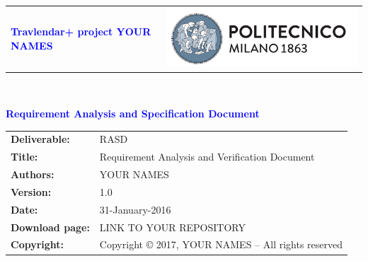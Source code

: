 





\begin{titlepage}



{\begin{table}[t!]
\centering
\begin{tabularx}{\textwidth}{@{}X X@{}}
        \textcolor{Blue}{\textbf{\small{Travlendar+ project YOUR NAMES}}} & \includegraphics[scale=0.5]{Images/PolimiLogo}
        \end{tabularx}
\end{table}}~\\ [7cm]


\begin{flushleft}

{\textcolor{Blue}{\textbf{\Huge{Requirement Analysis and Specification
        Document}}}} \\ [1cm]

\end{flushleft}

\end{titlepage}

\begin{table}[h!]
        \centering
        \begin{tabular}{@{} l p{} @{}}
            \hline
            \textbf{Deliverable:} & RASD \\ 
            \textbf{Title:} & Requirement Analysis and Verification Document \\
            \textbf{Authors:} & YOUR NAMES \\
            \textbf{Version:} & 1.0 \\ 
            \textbf{Date:} & 31-January-2016 \\
            \textbf{Download page:} & LINK TO YOUR REPOSITORY \\
            \textbf{Copyright:} & Copyright © 2017, YOUR NAMES – All rights reserved \\
            \hline
        \end{tabular}
    \end{table}





